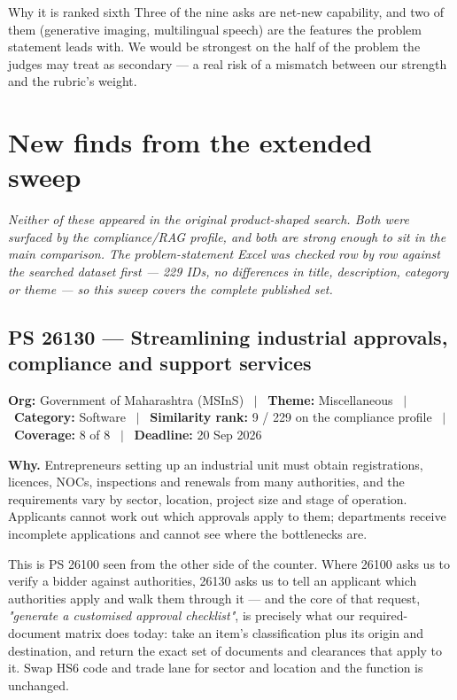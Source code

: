 \documentclass[11pt]{article}
\newcommand{\psbanner}[6]{%
  \vspace{0.2em}
  {\footnotesize\color{gxslate}\textbf{Org:} #1 \ $\vert$ \ \textbf{Theme:} #2 \ $\vert$ \ \textbf{Category:} #3 \ $\vert$ \ \textbf{Similarity rank:} #4 \ $\vert$ \ \textbf{Coverage:} #5 \ $\vert$ \ \textbf{Deadline:} #6}
  \par\vspace{0.6em}
}
\begin{document}
\begin{warnbox}{Why it is ranked sixth}
Three of the nine asks are net-new capability, and two of them (generative imaging, multilingual speech)
are the features the problem statement leads with. We would be strongest on the half of the problem the
judges may treat as secondary --- a real risk of a mismatch between our strength and the rubric's weight.
\end{warnbox}

\clearpage
\section{New finds from the extended sweep}
\textit{Neither of these appeared in the original product-shaped search. Both were surfaced by the
compliance/RAG profile, and both are strong enough to sit in the main comparison. The problem-statement
Excel was checked row by row against the searched dataset first --- 229 IDs, no differences in title,
description, category or theme --- so this sweep covers the complete published set.}

\subsection*{PS 26130 --- Streamlining industrial approvals, compliance and support services}
\psbanner{Government of Maharashtra (MSInS)}{Miscellaneous}{Software}{9 / 229 on the compliance profile}{8 of 8}{20 Sep 2026}

\noindent\textbf{Why.} Entrepreneurs setting up an industrial unit must obtain registrations, licences,
NOCs, inspections and renewals from many authorities, and the requirements vary by sector, location,
project size and stage of operation. Applicants cannot work out which approvals apply to them; departments
receive incomplete applications and cannot see where the bottlenecks are.

This is PS 26100 seen from the other side of the counter. Where 26100 asks us to verify a bidder against
authorities, 26130 asks us to tell an applicant which authorities apply and walk them through it --- and
the core of that request, \emph{"generate a customised approval checklist"}, is precisely what our
required-document matrix does today: take an item's classification plus its origin and destination, and
return the exact set of documents and clearances that apply to it. Swap HS6 code and trade lane for sector
and location and the function is unchanged.
\end{document}

